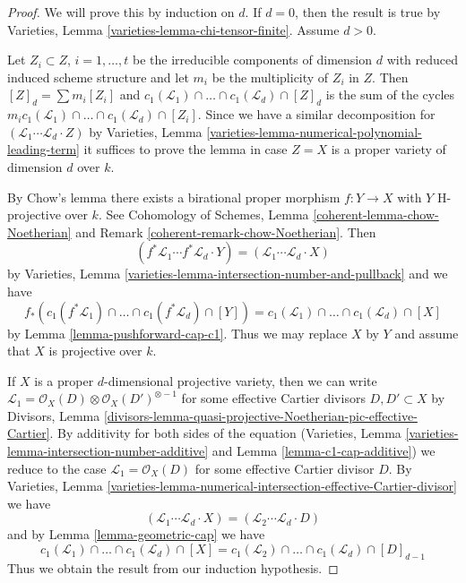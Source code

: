 \documentclass[10pt,a4paper]{amsart}
\theoremstyle{plain}
\theoremstyle{definition}
\theoremstyle{remark}
\numberwithin{equation}{subsection}
\begin{document}
\begin{proof}
We will prove this by induction on $d$. If $d = 0$, then the result is
true by Varieties, Lemma \ref{varieties-lemma-chi-tensor-finite}.
Assume $d > 0$.

\medskip\noindent
Let $Z_i \subset Z$, $i = 1, \ldots, t$ be the irreducible components
of dimension $d$ with reduced induced scheme structure and let $m_i$ be the
multiplicity of $Z_i$ in $Z$. Then $[Z]_d = \sum m_i[Z_i]$ and
$c_1(\mathcal{L}_1) \cap \ldots \cap c_1(\mathcal{L}_d) \cap [Z]_d$
is the sum of the cycles
$m_i c_1(\mathcal{L}_1) \cap \ldots \cap c_1(\mathcal{L}_d) \cap [Z_i]$.
Since we have a similar decomposition for
$(\mathcal{L}_1 \cdots \mathcal{L}_d \cdot Z)$ by
Varieties, Lemma \ref{varieties-lemma-numerical-polynomial-leading-term}
it suffices to prove the lemma in case $Z = X$
is a proper variety of dimension $d$ over $k$.

\medskip\noindent
By Chow's lemma there exists a birational proper morphism $f : Y \to X$
with $Y$ H-projective over $k$. See Cohomology of Schemes, Lemma
\ref{coherent-lemma-chow-Noetherian} and Remark
\ref{coherent-remark-chow-Noetherian}. Then
$$
(f^*\mathcal{L}_1 \cdots f^*\mathcal{L}_d \cdot Y) =
(\mathcal{L}_1 \cdots \mathcal{L}_d \cdot X)
$$
by Varieties, Lemma \ref{varieties-lemma-intersection-number-and-pullback}
and we have
$$
f_*(c_1(f^*\mathcal{L}_1) \cap \ldots \cap c_1(f^*\mathcal{L}_d) \cap [Y]) =
c_1(\mathcal{L}_1) \cap \ldots \cap c_1(\mathcal{L}_d) \cap [X]
$$
by Lemma \ref{lemma-pushforward-cap-c1}. Thus we may replace $X$ by $Y$
and assume that $X$ is projective over $k$.

\medskip\noindent
If $X$ is a proper $d$-dimensional projective variety, then we can
write $\mathcal{L}_1 = \mathcal{O}_X(D) \otimes \mathcal{O}_X(D')^{\otimes -1}$
for some effective Cartier divisors $D, D' \subset X$
by Divisors, Lemma
\ref{divisors-lemma-quasi-projective-Noetherian-pic-effective-Cartier}.
By additivity for both sides of the equation
(Varieties, Lemma \ref{varieties-lemma-intersection-number-additive} and
Lemma \ref{lemma-c1-cap-additive})
we reduce to the case $\mathcal{L}_1 = \mathcal{O}_X(D)$ for some
effective Cartier divisor $D$.
By Varieties, Lemma
\ref{varieties-lemma-numerical-intersection-effective-Cartier-divisor}
we have
$$
(\mathcal{L}_1 \cdots \mathcal{L}_d \cdot X) =
(\mathcal{L}_2 \cdots \mathcal{L}_d \cdot D)
$$
and by Lemma \ref{lemma-geometric-cap} we have
$$
c_1(\mathcal{L}_1) \cap \ldots \cap c_1(\mathcal{L}_d) \cap [X] =
c_1(\mathcal{L}_2) \cap \ldots \cap c_1(\mathcal{L}_d) \cap [D]_{d - 1}
$$
Thus we obtain the result from our induction hypothesis.
\end{proof}
\end{document}
